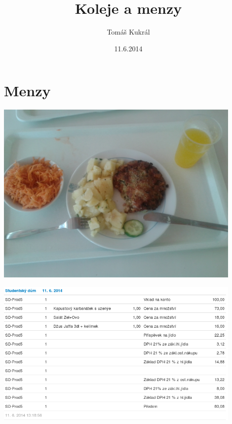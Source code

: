 \documentclass{beamer}
\author[Tomáš Kukrál]{Tomáš Kukrál}
\institute[tech@SU]{Studentská unie ČVUT - klub tech@SU}
\title[Koleje a menzy]{Koleje a menzy}
\date{11.6.2014}
\begin{document}
\begin{frame}
	\titlepage
\end{frame}

\section{Menzy}
\begin{frame}
	\begin{center}
	\includegraphics[width=0.9\textwidth]{obed_foto.jpg}
	\end{center}
\end{frame}

\begin{frame}
	\begin{center}
	\includegraphics[width=0.9\textwidth]{obed_cena.png}
	\end{center}
\end{frame}
\end{document}
